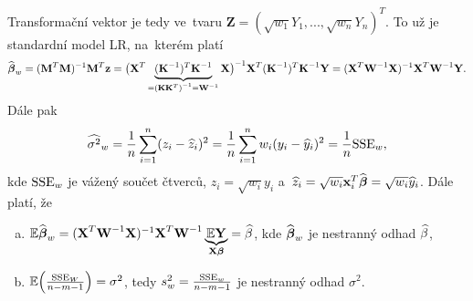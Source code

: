 Transformační vektor je tedy ve~tvaru $\textbf{Z} = (\sqrt{w_1}Y_1,...,\sqrt{w_n}Y_n)^T$. To už je standardní model LR, na~kterém platí
 $$ \widehat{\boldsymbol{\beta}}_w = {(\textbf{M}^T\textbf{M})^{-1}}\textbf{M}^T\textbf{z} = {\big(\textbf{X}^T\underbrace{(\textbf{K}^{-1})^T {\textbf{K}^{-1}}}_{ = {{(\textbf{K}\textbf{K}^T)}^{-1}} = {\textbf{W}^{-1}}}\textbf{X}\big)^{-1}}\textbf{X}^T({\textbf{K}^{-1}})^T{\textbf{K}^{-1}}\textbf{Y} = {(\textbf{X}^T{\textbf{W}^{-1}}\textbf{X})^{-1}}\textbf{X}^T{\textbf{W}^{-1}}\textbf{Y}. $$
Dále pak
 $$ \widehat{{\sigma}^2}_w = \frac{1}{n}\sum_{i = 1}^n (z_i-\widehat{z}_i)^2 = \frac{1}{n}\sum_{i = 1}^n w_i(y_i-\widehat{y}_i)^2 = \frac{1}{n}\mathrm{SSE}_w, $$ kde $\mathrm{SSE}_w$ je vážený součet čtverců, $z_i = \sqrt{w_i}y_i$ a~$\widehat{z}_i = \sqrt{w_i}\textbf{x}_i^T\widehat{\boldsymbol{\beta}} = \sqrt{w_i}\widehat{y}_i$.
Dále platí, že
\begin{enumerate}[a)]
	\item $\mathbb{E}\widehat{\boldsymbol{\beta}}_w = {(\textbf{X}^T{\textbf{W}^{-1}}\textbf{X})^{-1}}\textbf{X}^T{\textbf{W}^{-1}}\underbrace{\mathbb{E} \textbf{Y}}_{\textbf{X}\boldsymbol{\beta}} = \widehat{\beta}$, kde $\widehat{\boldsymbol{\beta}}_w$ je nestranný odhad $\widehat{\beta}$,
	\item $\mathbb{E}\Big(\frac{\mathrm{SSE}_W}{n-m-1}\Big) = \sigma^2$, tedy $s_w^2 = \frac{\mathrm{SSE}_w}{n-m-1}$ je nestranný odhad $\sigma^2$.
\end{enumerate}


